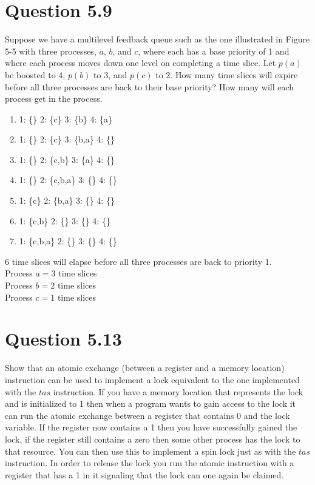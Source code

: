\documentclass{article}
\begin{document}
\section*{Question 5.9}
Suppose we have a multilevel feedback queue such as the one illustrated in Figure 5-5 with three processes, $a$, $b$, and $c$, where each has a base priority of 1 and where each process moves down one level on completing a time slice.
Let $p(a)$ be boosted to 4, $p(b)$ to 3, and $p(c)$ to 2.
How many time slices will expire before all three processes are back to their base priority?
How many will each process get in the process.
\newline
\newline
\begin{enumerate}
\item 1: \{\} 2: \{c\} 3: \{b\} 4: \{a\}
\item 1: \{\} 2: \{c\} 3: \{b,a\} 4: \{\}
\item 1: \{\} 2: \{c,b\} 3: \{a\} 4: \{\}
\item 1: \{\} 2: \{c,b,a\} 3: \{\} 4: \{\}
\item 1: \{c\} 2: \{b,a\} 3: \{\} 4: \{\}
\item 1: \{c,b\} 2: \{\} 3: \{\} 4: \{\}
\item 1: \{c,b,a\} 2: \{\} 3: \{\} 4: \{\}
\end{enumerate}
6 time slices will elapse before all three processes are back to priority 1.\\
Process $a = 3$ time slices \\
Process $b = 2$ time slices \\
Process $c = 1$ time slices \\

\section*{Question 5.13}
Show that an atomic exchange (between a register and a memory location) instruction can be used to implement a lock equivalent to the one implemented with the $tas$ instruction.
\newline
\newline
If you have a memory location that represents the lock and is initialized to 1 then when a program wants to gain access to the lock it can run the atomic exchange between a register that contains 0 and the lock variable.
If the register now contains a 1 then you have successfully gained the lock, if the register still contains a zero then some other process has the lock to that resource.
You can then use this to implement a spin lock just as with the $tas$ instruction.
In order to release the lock you run the atomic instruction with a register that has a 1 in it signaling that the lock can one again be claimed.
\end{document}
